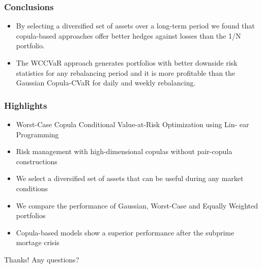 \documentclass[pdf,9pt,xcolor=dvipsnames,hide notes]{beamer}
\begin{document}
\begin{frame}[label=frame9d]
	\frametitle{Conclusions}
	
	\begin{itemize}
		\justifying
		
		\item By selecting a diversified set of assets over a long-term period we found that copula-based approaches offer better hedges against losses than the 1/N portfolio.
		
		\vspace{0.3cm}
		
		\item The WCCVaR approach generates portfolios with better downside
		risk statistics for any rebalancing period and it is more profitable than the Gaussian Copula-CVaR for daily and weekly rebalancing. 
		
		\end{itemize}
	
\end{frame}
		
		\begin{frame}[label=frame9e]
		\frametitle{Highlights}
		
		\begin{itemize}
			\justifying
		
		\item Worst-Case Copula Conditional Value-at-Risk Optimization using Lin-
		ear Programming
		
		\vspace{0.3cm}
		
		\item Risk management with high-dimensional copulas without pair-copula
		constructions
		
		\vspace{0.3cm}
		
		\item We select a diversified set of assets that can be useful during any market conditions
		
		\vspace{0.3cm}
		
		\item We compare the performance of Gaussian, Worst-Case and Equally
		Weighted portfolios
		
		\vspace{0.3cm}
		
		\item Copula-based models show a superior performance after the subprime
		mortage crisis
		
		\end{itemize}
	
\end{frame}


\begin{frame}

\centering
\Large{Thanks! Any questions?}

\end{frame}
\end{document}
